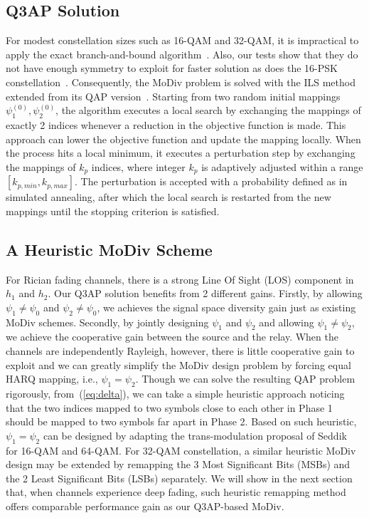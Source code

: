 \documentclass[journal,draftcls,onecolumn,12pt,twoside]{IEEEtran}
\begin{document}
\subsection{Q3AP Solution}
For modest constellation sizes such as 16-QAM and 32-QAM, it is impractical
to apply the exact branch-and-bound algorithm~\cite{hahn2008quadratic}. Also,
our tests show that they do not have enough symmetry to exploit for faster
solution as does the 16-PSK constellation~\cite{mittelmann2015solving}.
Consequently, the MoDiv problem is solved with the ILS
method~\cite{hahn2008quadratic} extended from its QAP
version~\cite{stutzle2006iterated}. Starting from two random initial mappings
$\psi_1^{(0)}, \psi_2^{(0)}$, the algorithm executes a local search by
exchanging the mappings of exactly 2 indices whenever a reduction in the
objective function is made. This approach can lower the objective function and
update the mapping locally. When the process hits a local minimum, it executes a
perturbation step by exchanging the mappings of $k_p$ indices, where integer
$k_p$ is adaptively adjusted within a range $[k_{p,min}, k_{p,max}]$. The
perturbation is accepted with a probability defined as in simulated annealing, after which the
local search is restarted from the new mappings until the stopping criterion is
satisfied.

\subsection{A Heuristic MoDiv Scheme}
\label{sec:heuristic}
For Rician fading channels, there is a strong Line Of Sight (LOS) component in
$h_1$ and $h_2$. Our Q3AP solution benefits from 2 different gains. Firstly, by
allowing $\psi_1\not=\psi_0$ and $\psi_2\not=\psi_0$, we achieves the signal
space diversity gain just as existing MoDiv schemes. Secondly, by jointly
designing $\psi_1$ and $\psi_2$ and allowing $\psi_1\not=\psi_2$, we achieve the
cooperative gain between the source and the relay. When the channels are
independently Rayleigh, however, there is little cooperative gain to exploit and
we can greatly simplify the MoDiv design problem by forcing equal HARQ mapping,
i.e., $\psi_1=\psi_2$.
Though we can solve the resulting QAP problem rigorously, from~(\ref{eq:delta}),
we can take a simple heuristic approach noticing that the two indices mapped to
two symbols close to each other in Phase 1 should be mapped to two symbols far
apart in Phase 2. Based on such heuristic, $\psi_1=\psi_2$ can be designed by
adapting the trans-modulation proposal of Seddik~\cite{seddik2008trans} for
16-QAM and 64-QAM. For 32-QAM constellation, a similar heuristic MoDiv design may be
extended by remapping the 3 Most Significant Bits (MSBs) and the 2 Least
Significant Bits (LSBs) separately. We will show in the next section that, when
channels experience deep fading, such heuristic remapping method offers
comparable performance gain as our Q3AP-based MoDiv.
\end{document}
